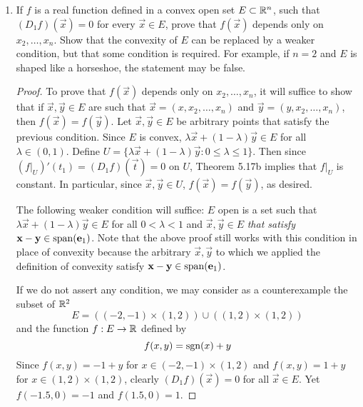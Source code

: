 \documentclass[../psets.tex]{subfiles}
\begin{document}
\begin{enumerate}[label={\textbf{\arabic*.}}]
\begin{proof}
        \begin{equation*}
            (D_jf)(\vec{x}) = (f|_{U_j})'(x_j) = 0
        \end{equation*}
        as desired.
    \end{proof}
    \item If $f$ is a real function defined in a convex open set $E\subset\mathbb{R}^n$, such that $(D_1f)(\vec{x})=0$ for every $\vec{x}\in E$, prove that $f(\vec{x})$ depends only on $x_2,\dots,x_n$. Show that the convexity of $E$ can be replaced by a weaker condition, but that some condition is required. For example, if $n=2$ and $E$ is shaped like a horseshoe, the statement may be false.
    \begin{proof}
        To prove that $f(\vec{x})$ depends only on $x_2,\dots,x_n$, it will suffice to show that if $\vec{x},\vec{y}\in E$ are such that $\vec{x}=(x,x_2,\dots,x_n)$ and $\vec{y}=(y,x_2,\dots,x_n)$, then $f(\vec{x})=f(\vec{y})$. Let $\vec{x},\vec{y}\in E$ be arbitrary points that satisfy the previous condition. Since $E$ is convex, $\lambda\vec{x}+(1-\lambda)\vec{y}\in E$ for all $\lambda\in(0,1)$. Define $U=\{\lambda\vec{x}+(1-\lambda)\vec{y}:0\leq\lambda\leq 1\}$. Then since $(f|_U)'(t_1)=(D_1f)(\vec{t})=0$ on $U$, Theorem 5.17b implies that $f|_U$ is constant. In particular, since $\vec{x},\vec{y}\in U$, $f(\vec{x})=f(\vec{y})$, as desired.\par
        The following weaker condition will suffice: $E$ open is a set such that $\lambda\vec{x}+(1-\lambda)\vec{y}\in E$ for all $0<\lambda<1$ and $\vec{x},\vec{y}\in E$ \emph{that satisfy} $\mathbf{x}-\mathbf{y}\in\operatorname{span}(\mathbf{e}_1)$. Note that the above proof still works with this condition in place of convexity because the arbitrary $\vec{x},\vec{y}$ to which we applied the definition of convexity satisfy $\mathbf{x}-\mathbf{y}\in\operatorname{span}(\mathbf{e}_1)$.\par
        If we do not assert any condition, we may consider as a counterexample the subset of $\mathbb{R}^2$
        \begin{equation*}
            E = ((-2,-1)\times(1,2))\cup((1,2)\times(1,2))
        \end{equation*}
        and the function $f:E\to\mathbb{R}$ defined by
        \begin{equation*}
            f(x,y) = \operatorname{sgn}(x)+y
        \end{equation*}
        Since $f(x,y)=-1+y$ for $x\in(-2,-1)\times(1,2)$ and $f(x,y)=1+y$ for $x\in(1,2)\times(1,2)$, clearly $(D_1f)(\vec{x})=0$ for all $\vec{x}\in E$. Yet $f(-1.5,0)=-1$ and $f(1.5,0)=1$.

\end{proof}
\end{enumerate}
\end{document}
